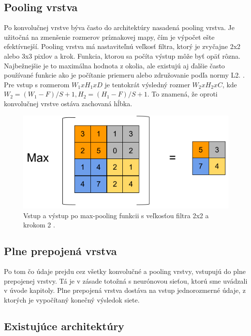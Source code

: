 \subsection{Pooling vrstva}

Po konvolučnej vrstve býva často do architektúry nasadená pooling vrstva. Je užitočná na zmenšenie rozmerov príznakovej mapy, čím je výpočet ešte efektívnejší. Pooling vrstva má nastaviteľnú veľkosť filtra, ktorý je zvyčajne 2x2 alebo 3x3 pixlov a krok. Funkcia, ktorou sa počíta výstup môže byť opäť rôzna. Najbežnejšie je to maximálna hodnota z okolia, ale existujú aj ďalšie často používané funkcie ako je počítanie priemeru alebo združovanie podľa normy L2. \cite{cnn-intro}. Pre vstup s rozmerom \begin{math}W_1xH_1xD\end{math} je tentokrát výsledný rozmer \begin{math}W_2xH_2xC\end{math}, kde \begin{math}W_2 = (W_1 - F)/S + 1, H_2 = (H_1 - F)/S + 1\end{math}. To znamená, že oproti konvolučnej vrstve ostáva zachovaná hĺbka.

\begin{figure}[ht]
    \centering
    \includegraphics[width=.5\textwidth]{images/02/pooling.png}
    \caption{Vstup a výstup po max-pooling funkcii s veľkosťou filtra 2x2 a krokom 2 \cite{pool}.}
    \label{img:maxpool}
\end{figure}

\subsection{Plne prepojená vrstva}

Po tom čo údaje prejdu cez všetky konvolučné a pooling vrstvy, vstupujú do plne prepojenej vrstvy. Tá je v zásade totožná s neurónovou sieťou, ktorú sme uvádzali v úvode kapitoly. Plne prepojená vrstva dostáva na vstup jednorozmerné údaje, z ktorých je vypočítaný konečný výsledok siete.

\subsection{Existujúce architektúry}

